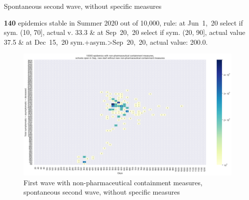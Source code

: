 \documentclass[8pt]{beamer}
\begin{document}
\begin{frame}{Spontaneous second wave, without specific measures}


\textbf{140} {\tiny epidemics stable in Summer 2020 out of 10,000, rule: at Jun~1,~20 select if sym. (10, 70], actual v. 33.3 \& at Sep~20,~20 select if sym. (20, 90], actual value 37.5 \& at Dec~15,~20 sym.+asym.>Sep~20,~20, actual value: 200.0.}

\begin{figure}[H]
\center
\includegraphics[scale=0.17]{10kSpontWave2.png}
\caption{First wave with non-pharmaceutical containment measures, spontaneous second wave, without specific measures}
\label{selSpontWave2}
\end{figure}



\end{frame}
\end{document}
